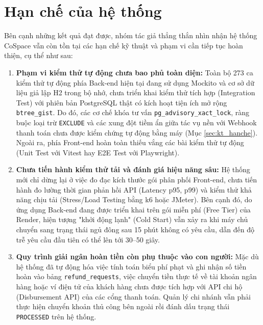 \section{Hạn chế của hệ thống}
\label{sec:kl_hanche}

Bên cạnh những kết quả đạt được, nhóm tác giả thẳng thắn nhìn nhận hệ thống CoSpace vẫn còn tồn tại các hạn chế kỹ thuật và phạm vi cần tiếp tục hoàn thiện, cụ thể như sau:

\begin{enumerate}
    \item \textbf{Phạm vi kiểm thử tự động chưa bao phủ toàn diện:} Toàn bộ 273 ca kiểm thử tự động phía Back-end hiện tại đang sử dụng Mockito và cơ sở dữ liệu giả lập H2 trong bộ nhớ, chưa triển khai kiểm thử tích hợp (Integration Test) với phiên bản PostgreSQL thật có kích hoạt tiện ích mở rộng \texttt{btree\_gist}. Do đó, các cơ chế khóa tư vấn \texttt{pg\_advisory\_xact\_lock}, ràng buộc loại trừ \texttt{EXCLUDE} và các xung đột tiềm ẩn giữa tác vụ nền với Webhook thanh toán chưa được kiểm chứng tự động bằng máy (Mục \ref{sec:kt_hanche}). Ngoài ra, phía Front-end hoàn toàn thiếu vắng các bài kiểm thử tự động (Unit Test với Vitest hay E2E Test với Playwright).
    
    \item \textbf{Chưa tiến hành kiểm thử tải và đánh giá hiệu năng sâu:} Hệ thống mới chỉ dừng lại ở việc đo đạc kích thước gói phân phối Front-end, chưa tiến hành đo lường thời gian phản hồi API (Latency p95, p99) và kiểm thử khả năng chịu tải (Stress/Load Testing bằng k6 hoặc JMeter). Bên cạnh đó, do ứng dụng Back-end đang được triển khai trên gói miễn phí (Free Tier) của Render, hiện tượng "khởi động lạnh" (Cold Start) vẫn xảy ra khi máy chủ chuyển sang trạng thái ngủ đông sau 15 phút không có yêu cầu, dẫn đến độ trễ yêu cầu đầu tiên có thể lên tới 30--50 giây.
    
    \item \textbf{Quy trình giải ngân hoàn tiền còn phụ thuộc vào con người:} Mặc dù hệ thống đã tự động hóa việc tính toán biểu phí phạt và ghi nhận số tiền hoàn vào bảng \texttt{refund\_requests}, việc chuyển tiền thực tế về tài khoản ngân hàng hoặc ví điện tử của khách hàng chưa được tích hợp với API chi hộ (Disbursement API) của các cổng thanh toán. Quản lý chi nhánh vẫn phải thực hiện chuyển khoản thủ công bên ngoài rồi đánh dấu trạng thái \texttt{PROCESSED} trên hệ thống.
    

\end{enumerate}
